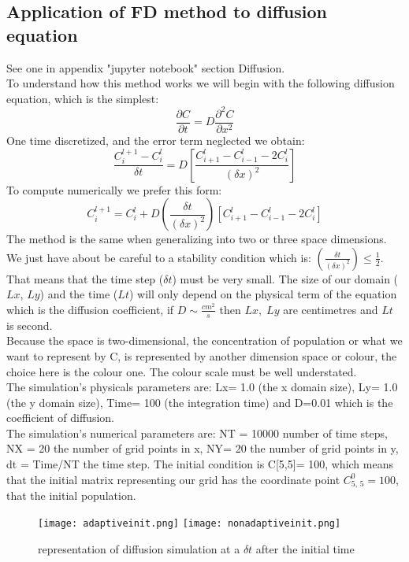 \documentclass[a4paper,11pt]{report}
\begin{document}
\subsection{Application of FD method to diffusion equation}
See one in appendix "jupyter notebook" section Diffusion. \\
To understand how this method works we will begin with the  following diffusion equation, which is the simplest:
$$
\frac{\partial C}{\partial t}=D \frac{\partial^{2}C}{\partial x^{2}}
$$
One time discretized, and the error term neglected we obtain:
$$
\frac{C_{i}^{l+1}-C_{i}^{l}}{\delta t}=D[ \frac{C_{i+1}^{l}-C_{i-1}^{l}-2 C_{i}^{l}}{(\delta x)^{2}}]
$$
To compute numerically we prefer this form:
$$
C_{i}^{l+1}=C_{i}^{l} +  D(\frac{\delta t}{(\delta x)^{2}})[ C_{i+1}^{l}-C_{i-1}^{l}-2 C_{i}^{l}]
$$
The method is the same when generalizing into two or three space dimensions. We just have about be careful to a stability condition which is: $(\frac{\delta t}{(\delta x)^{2}}) \leq \frac{1}{2}$. That means that the time step ($\delta t $) must be very small. \cite{Crank1975} The size of our domain ($Lx$, $Ly$) and the time ($Lt$) will only depend on the physical term of the equation which is the diffusion coefficient, if $D \sim \frac{cm^{2}}{s}$ then $Lx, \; Ly$ are centimetres and $Lt$ is second. \\
Because the space is two-dimensional, the concentration of population or what we want to represent by C, is represented by another dimension space or colour, the choice here is the colour one. The colour scale must be well understated. \\
The simulation's physicals parameters are: Lx= 1.0 (the x domain size), Ly= 1.0 (the y domain size), Time= 100 (the integration time) and D=0.01 which is the coefficient of diffusion.\\ 
The simulation's numerical parameters are: NT = 10000 number of time steps, NX = 20 the number of grid points in x, NY= 20 the number of grid points in y, dt = Time/NT the time step. The initial condition is C[5,5]= 100, which means that the initial matrix representing our grid has the coordinate point $C_{5, \, 5}^{0}=100 $, that the initial population.

\newpage
\begin{figure}
\texttt{[image: adaptiveinit.png]}\hfill
\texttt{[image: nonadaptiveinit.png]}
\caption{representation of diffusion simulation at a $\delta t$ after the initial time}\label{fig1}
\end{figure} 
\end{document}
